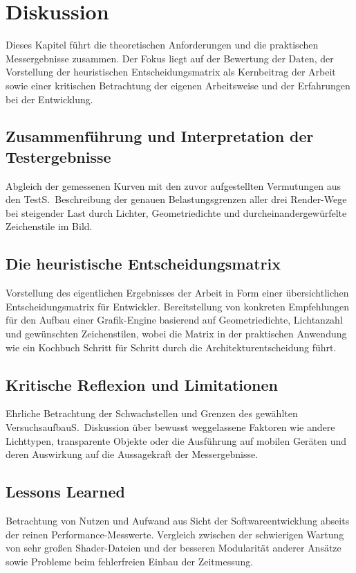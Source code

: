 \chapter{Diskussion}
\label{ch:06_diskussion}

Dieses Kapitel führt die theoretischen Anforderungen und die praktischen Messergebnisse zusammen. Der Fokus liegt auf der Bewertung der Daten, der Vorstellung der heuristischen Entscheidungsmatrix als Kernbeitrag der Arbeit sowie einer kritischen Betrachtung der eigenen Arbeitsweise und der Erfahrungen bei der Entwicklung.


\section{Zusammenführung und Interpretation der Testergebnisse}
\label{sec:0601_interpretation_results}

Abgleich der gemessenen Kurven mit den zuvor aufgestellten Vermutungen aus den TestS.~Beschreibung der genauen Belastungsgrenzen aller drei Render-Wege bei steigender Last durch Lichter, Geometriedichte und durcheinandergewürfelte Zeichenstile im Bild.


\section{Die heuristische Entscheidungsmatrix}
\label{sec:0602_heuristic_matrix}

Vorstellung des eigentlichen Ergebnisses der Arbeit in Form einer übersichtlichen Entscheidungsmatrix für Entwickler. Bereitstellung von konkreten Empfehlungen für den Aufbau einer Grafik-Engine basierend auf Geometriedichte, Lichtanzahl und gewünschten Zeichenstilen, wobei die Matrix in der praktischen Anwendung wie ein Kochbuch Schritt für Schritt durch die Architekturentscheidung führt.


\section{Kritische Reflexion und Limitationen}
\label{sec:0603_limitations}

Ehrliche Betrachtung der Schwachstellen und Grenzen des gewählten VersuchsaufbauS.~Diskussion über bewusst weggelassene Faktoren wie andere Lichttypen, transparente Objekte oder die Ausführung auf mobilen Geräten und deren Auswirkung auf die Aussagekraft der Messergebnisse.


\section{Lessons Learned}
\label{sec:0604_lessons_learned_engineering}

Betrachtung von Nutzen und Aufwand aus Sicht der Softwareentwicklung abseits der reinen Performance-Messwerte. Vergleich zwischen der schwierigen Wartung von sehr großen Shader-Dateien und der besseren Modularität anderer Ansätze sowie Probleme beim fehlerfreien Einbau der Zeitmessung.